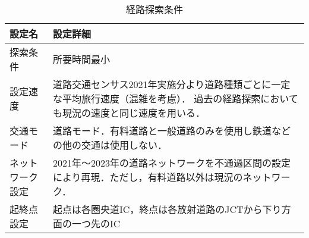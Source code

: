 \begin{table}[h!]
  \centering
  \renewcommand{\arraystretch}{1.2} %
  \begin{tabularx}{\textwidth}{p{}   X}
  \toprule
  \textbf{設定名}     &\textbf{設定詳細}                                 \\
  \midrule
  探索条件            & 所要時間最小                                  \\
  設定速度            & 道路交通センサス2021年実施分より道路種類ごとに一定な平均旅行速度（混雑を考慮）．\cite{kokudo2021} 過去の経路探索においても現況の速度と同じ速度を用いる．           \\
  交通モード            & 道路モード．有料道路と一般道路のみを使用し鉄道などの他の交通は使用しない．                                  \\
  ネットワーク設定          & 2021年〜2023年の道路ネットワークを不通過区間の設定により再現．ただし，有料道路以外は現況のネットワーク．                                  \\
  起終点設定            & 起点は各圏央道IC，終点は各放射道路のJCTから下り方面の一つ先のIC                               \\
  \bottomrule
  \end{tabularx}
  \caption{経路探索条件}
  \label{conditions of search}
  \end{table}
  

